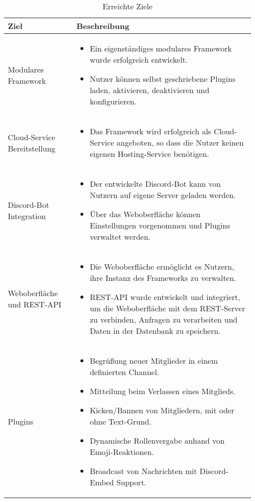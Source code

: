 \begin{table}[!h]
    \centering
    \begin{tabular}{lp{10cm}}
        \toprule
        \textbf{Ziel} & \textbf{Beschreibung} \\
        \midrule
        Modulares Framework &
        \begin{itemize}
            \item Ein eigenständiges modulares Framework wurde erfolgreich entwickelt.
            \item Nutzer können selbst geschriebene Plugins laden, aktivieren, deaktivieren und konfigurieren.
        \end{itemize} \\
        \midrule
        Cloud-Service Bereitstellung &
        \begin{itemize}
            \item Das Framework wird erfolgreich als Cloud-Service angeboten, so dass die Nutzer keinen eigenen Hosting-Service benötigen.
        \end{itemize} \\
        \midrule
        Discord-Bot Integration &
        \begin{itemize}
            \item Der entwickelte Discord-Bot kann von Nutzern auf eigene Server geladen werden.
            \item Über das Weboberfläche können Einstellungen vorgenommen und Plugins verwaltet werden.
        \end{itemize} \\
        \midrule
        Weboberfläche und REST-API &
        \begin{itemize}
            \item Die Weboberfläche ermöglicht es Nutzern, ihre Instanz des Frameworks zu verwalten.
            \item REST-API wurde entwickelt und integriert, um die Weboberfläche mit dem REST-Server zu verbinden, Anfragen zu verarbeiten und Daten in der Datenbank zu speichern.
        \end{itemize} \\
        \midrule
        Plugins &
        \begin{itemize}
            \item Begrüßung neuer Mitglieder in einem definierten Channel.
            \item Mitteilung beim Verlassen eines Mitglieds.
            \item Kicken/Bannen von Mitgliedern, mit oder ohne Text-Grund.
            \item Dynamische Rollenvergabe anhand von Emoji-Reaktionen.
            \item Broadcast von Nachrichten mit Discord-Embed Support.
        \end{itemize} \\
        \bottomrule
    \end{tabular}
    \caption{Erreichte Ziele}
    \label{tab:erreichte_ziele}
\end{table}

